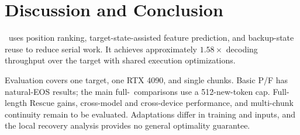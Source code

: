 \section{Discussion and Conclusion}
\label{sec:conclusion}
\PF\ uses position ranking, target-state-assisted feature prediction, and backup-state reuse to reduce serial work. It achieves approximately $1.58\times$ decoding throughput over the target with shared execution optimizations.

Evaluation covers one target, one RTX 4090, and single chunks. Basic P/F has natural-EOS results; the main full-\PF\ comparisons use a 512-new-token cap. Full-length Rescue gains, cross-model and cross-device performance, and multi-chunk continuity remain to be evaluated. Adaptations differ in training and inputs, and the local recovery analysis provides no general optimality guarantee.
